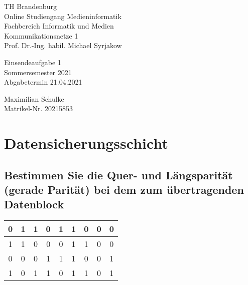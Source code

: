 \documentclass{article}
\begin{document}
\begin{titlepage}
	\begin{flushleft}
		TH Brandenburg \\
		Online Studiengang Medieninformatik \\
		Fachbereich Informatik und Medien \\
		Kommunikationsnetze 1 \\
		Prof. Dr.-Ing. habil. Michael Syrjakow
	\end{flushleft}

	\vfill

	\begin{center}
		\Large{Einsendeaufgabe 1}\\[0.5em]
		\large{Sommersemester 2021}\\[0.25em]
		\large{Abgabetermin 21.04.2021}
	\end{center}

	\vfill

	\begin{flushright}
		Maximilian Schulke \\
		Matrikel-Nr. 20215853
	\end{flushright}
\end{titlepage}

\newpage

\section{Datensicherungsschicht}

\subsection{Bestimmen Sie die Quer- und Längsparität (gerade Parität) bei dem zum übertragenden Datenblock}

\begin{center}
	\begin{tabular}{|c|c|c|c|c|c|c|c|c|}
		\hline
		0                    & 1                    & 1                    & 0                    & 1                    & 1                    & 0                    & 0                    & \cellcolor{gray!25}0 \\
		\hline
		1                    & 1                    & 0                    & 0                    & 0                    & 1                    & 1                    & 0                    & \cellcolor{gray!25}0 \\
		\hline
		0                    & 0                    & 0                    & 1                    & 1                    & 1                    & 0                    & 0                    & \cellcolor{gray!25}1 \\
		\hline
		\cellcolor{gray!25}1 & \cellcolor{gray!25}0 & \cellcolor{gray!25}1 & \cellcolor{gray!25}1 & \cellcolor{gray!25}0 & \cellcolor{gray!25}1 & \cellcolor{gray!25}1 & \cellcolor{gray!25}0 & \cellcolor{gray!25}1 \\
		\hline
	\end{tabular}
\end{center}
\end{document}
